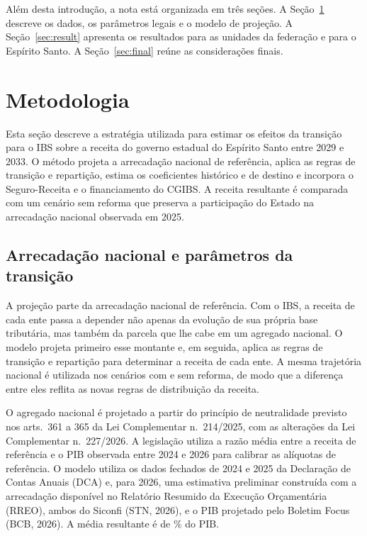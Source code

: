 \documentclass[12pt,a4paper]{article}
\newcommand{\nn}{n.\textordmasculine}
\begin{document}
Além desta introdução, a nota está organizada em três seções. A Seção~\ref{sec:metodo} descreve os dados, os parâmetros legais e o modelo de projeção. A Seção~\ref{sec:result} apresenta os resultados para as unidades da federação e para o Espírito Santo. A Seção~\ref{sec:final} reúne as considerações finais.

\section{Metodologia}\label{sec:metodo}

Esta seção descreve a estratégia utilizada para estimar os efeitos da transição para o IBS sobre a receita do governo estadual do Espírito Santo entre 2029 e 2033. O método projeta a arrecadação nacional de referência, aplica as regras de transição e repartição, estima os coeficientes histórico e de destino e incorpora o Seguro-Receita e o financiamento do CGIBS. A receita resultante é comparada com um cenário sem reforma que preserva a participação do Estado na arrecadação nacional observada em 2025.

\subsection{Arrecadação nacional e parâmetros da transição}

A projeção parte da arrecadação nacional de referência. Com o IBS, a receita de cada ente passa a depender não apenas da evolução de sua própria base tributária, mas também da parcela que lhe cabe em um agregado nacional. O modelo projeta primeiro esse montante e, em seguida, aplica as regras de transição e repartição para determinar a receita de cada ente. A mesma trajetória nacional é utilizada nos cenários com e sem reforma, de modo que a diferença entre eles reflita as novas regras de distribuição da receita.

O agregado nacional é projetado a partir do princípio de neutralidade previsto nos arts.~361 a 365 da Lei Complementar \nn~214/2025, com as alterações da Lei Complementar \nn~227/2026. A legislação utiliza a razão média entre a receita de referência e o PIB observada entre 2024 e 2026 para calibrar as alíquotas de referência. O modelo utiliza os dados fechados de 2024 e 2025 da Declaração de Contas Anuais (DCA) e, para 2026, uma estimativa preliminar construída com a arrecadação disponível no Relatório Resumido da Execução Orçamentária (RREO), ambos do Siconfi (STN, 2026), e o PIB projetado pelo Boletim Focus (BCB, 2026). A média resultante é de \NumRazaoPib\% do PIB.
\end{document}
